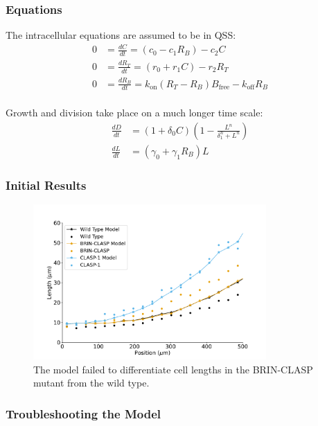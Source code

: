 \documentclass{beamer}
\begin{document}
\begin{frame}
\frametitle{Equations}

The intracellular equations are assumed to be in QSS:
$$
\begin{aligned}
  0 &= \frac{ dC }{ dt } = (c_{0} - c_{1}R_{B}) - c_{2}C \\[5pt]
  0 &= \frac{ dR_{T} }{ dt } = (r_{0}  + r_{1}C) - r_{2}R_{T} \\[5pt]
  0 &= \frac{ dR_{B} }{ dt } = k_{\text{on}}(R_{T} - R_{B})B_{\text{free}} - k_{\text{off}}R_{B} \\[5pt]
\end{aligned} 
$$

Growth and division take place on a much longer time scale:
$$
\begin{aligned}
\frac{ dD }{ dt } &= (1 + \delta_{0}C) \left( 1 - \frac{ L^{ n } }{ \delta_{1}^{ n } + L^{ n } } \right)  \\[5pt]
\frac{ dL }{ dt } &= \left(\gamma_{0}  +  \gamma_{1}R_{B}\right)L  
\end{aligned}
$$
\end{frame}

\begin{frame}
\frametitle{Initial Results}
\begin{figure}
  \centering
  \includegraphics[height=16em]{column-original-fit.pdf}
  \caption{The model failed to differentiate cell lengths in the BRIN-CLASP mutant from the wild type.}
\end{figure}
\end{frame}

\begin{frame}
\frametitle{Troubleshooting the Model}

\bigskip


\bigskip

 
\end{frame}
\end{document}

